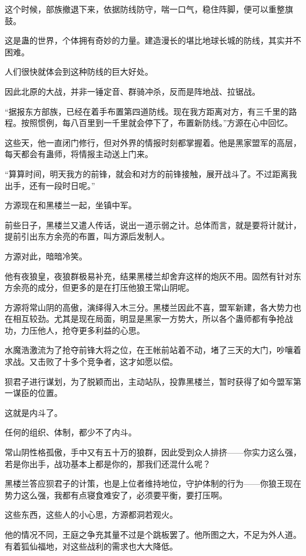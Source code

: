 \begin{this_body}
这个时候，部族撤退下来，依据防线防守，喘一口气，稳住阵脚，便可以重整旗鼓。

这是蛊的世界，个体拥有奇妙的力量。建造漫长的堪比地球长城的防线，其实并不困难。

人们很快就体会到这种防线的巨大好处。

因此北原的大战，并非一锤定音、群骑冲杀，反而是阵地战、拉锯战。

“据报东方部族，已经在着手布置第四道防线。现在我方距离对方，有三千里的路程。按照惯例，每八百里到一千里就会停下了，布置新防线。”方源在心中回忆。

这些天，他一直闭门修行，但对外界的情报时刻都掌握着。他是黑家盟军的高层，每天都会有蛊师，将情报主动送上门来。

“算算时间，明天我方的前锋，就会和对方的前锋接触，展开战斗了。不过距离我出手，还有一段时日呢。”

方源现在和黑楼兰一起，坐镇中军。

前些日子，黑楼兰又遣人传话，说出一道示弱之计。总体而言，就是要将计就计，提前引出东方余亮的布置，叫方源后发制人。

方源对此，暗暗冷笑。

他有夜狼皇，夜狼群极易补充，结果黑楼兰却舍弃这样的炮灰不用。固然有针对东方余亮的成分，但更多的是在打压他狼王常山阴呢。

方源将常山阴的高傲，演绎得入木三分。黑楼兰因此不喜，盟军新建，各大势力也在相互较劲。尤其是现在局面，明显是黑家一方势大，所以各个蛊师都有争抢战功，力压他人，抢夺更多利益的心思。

水魔浩激流为了抢夺前锋大将之位，在王帐前站着不动，堵了三天的大门，吵嚷着求战。又击败了十多个竞争者，这才如愿以偿。

狈君子进行谋划，为了脱颖而出，主动站队，投靠黑楼兰，暂时获得了如今盟军第一谋臣的位置。

这就是内斗了。

任何的组织、体制，都少不了内斗。

常山阴性格孤傲，手中又有五十万的狼群，因此受到众人排挤——你实力这么强，若是你出手，战功基本上都是你的，那我们还混什么呢？

黑楼兰答应狈君子的计策，也是上位者维持地位，守护体制的行为——你狼王现在势力这么强，我都有点寝食难安了，必须要平衡，要打压啊。

这些东西，这些人的小心思，方源都洞若观火。

他的情况不同，王庭之争充其量不过是个跳板罢了。他所图之大，不足为外人道。有着狐仙福地，对这些战利的需求也大大降低。


\end{this_body}
